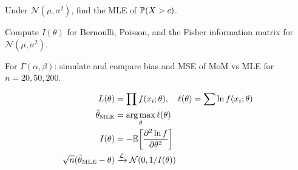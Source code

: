 \begin{exercise}
Under $\mathcal{N}(\mu,\sigma^2)$, find the MLE of $\mathbb{P}(X>c)$.
\end{exercise}

\begin{exercise}
Compute $I(\theta)$ for Bernoulli, Poisson, and the Fisher information matrix for $\mathcal{N}(\mu,\sigma^2)$.
\end{exercise}

\begin{exercise}
For $\Gamma(\alpha,\beta)$: simulate and compare bias and MSE of MoM vs MLE for $n=20,50,200$.
\end{exercise}

\begin{keyformulas}
\begin{align*}
L(\theta) &= \prod f(x_i;\theta), \quad \ell(\theta)=\sum \ln f(x_i;\theta) \\
\hat{\theta}_{\mathrm{MLE}} &= \operatorname*{arg\,max}_\theta \ell(\theta) \\
I(\theta) &= -\mathbb{E}\!\left[\frac{\partial^2\ln f}{\partial\theta^2}\right] \\
\sqrt{n}(\hat{\theta}_{\mathrm{MLE}}-\theta) &\xrightarrow{\mathcal{L}} \mathcal{N}(0,1/I(\theta))
\end{align*}
\end{keyformulas}
